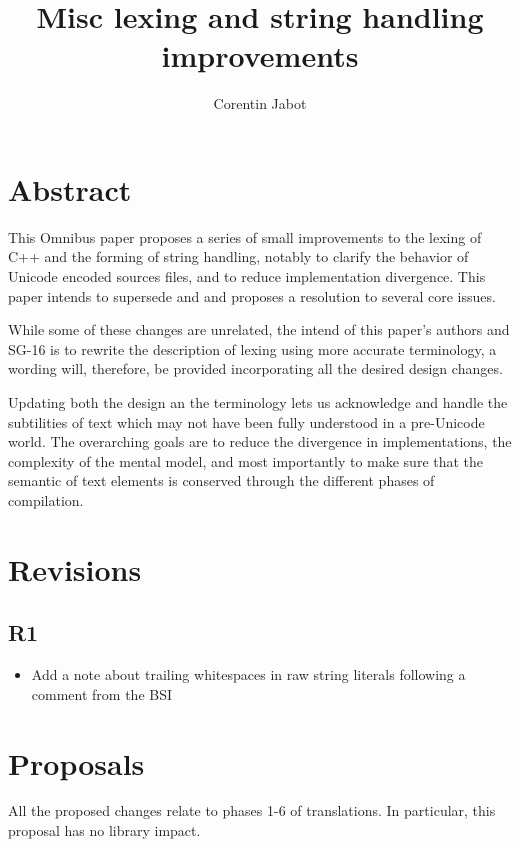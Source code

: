 \documentclass{wg21}
\title{Misc lexing and string handling improvements}
\author{Corentin Jabot}{corentin.jabot@gmail.com}
\begin{document}
\maketitle

\paperquote{}

\section{Abstract}

This Omnibus paper proposes a series of small improvements to the lexing of C++ and the forming of string handling,
notably to clarify the behavior of Unicode encoded sources files, and to reduce implementation divergence.
This paper intends to supersede  and  and proposes a resolution to several core issues.

While some of these changes are unrelated, the intend of this paper's authors and SG-16 is to rewrite the description of lexing
using more accurate terminology, a wording will, therefore, be provided incorporating all the desired design changes.

Updating both the design an the terminology lets us acknowledge and handle the subtilities of text which may not have been fully understood
in a pre-Unicode world.
The overarching goals are to reduce the divergence in implementations, the complexity of the mental model, and most importantly to make sure that
the semantic of text elements is conserved through the different phases of compilation.

\section{Revisions}

\subsection{R1}
\begin{itemize}
\item Add a note about trailing whitespaces in raw string literals following a comment from the BSI
\end{itemize}

\section{Proposals}

All the proposed changes relate to phases 1-6 of translations.
In particular, this proposal has no library impact.
\end{document}
